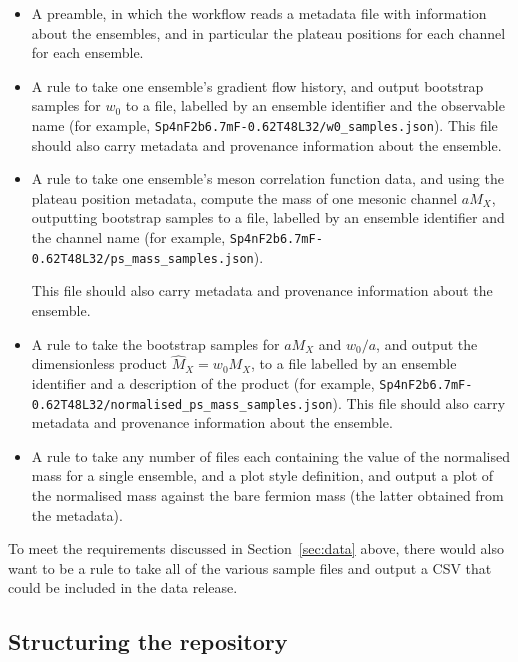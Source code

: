 \documentclass{article}
\begin{document}
\begin{itemize}
  \item
        A preamble,
        in which the workflow reads a metadata file with information about the ensembles,
        and in particular the plateau positions for each channel for each ensemble.
  \item
        A rule to take one ensemble's gradient flow history,
        and output bootstrap samples for $w_{0}$ to a file,
        labelled by an ensemble identifier and the observable name
        (for example,
        \texttt{Sp4nF2b6.7mF-0.62T48L32/\hspace{0pt}w0\_samples.json}).
        This file should also carry metadata and provenance information about the ensemble.
  \item
        A rule to take one ensemble's meson correlation function data,
        and using the plateau position metadata,
        compute the mass of one mesonic channel $aM_{X}$,
        outputting bootstrap samples to a file,
        labelled by an ensemble identifier and the channel name
        (for example,
        \texttt{Sp4nF2b6.7mF-0.62T48L32/\hspace{0pt}ps\_mass\_samples.json}).

        This file should also carry metadata and provenance information about the ensemble.
  \item
        A rule to take the bootstrap samples for $aM_{X}$ and $w_{0}/a$,
        and output the dimensionless product $\hat{M}_{X}=w_{0}M_{X}$,
        to a file labelled by an ensemble identifier and a description of the product
        (for example,
        \texttt{Sp4nF2b6.7mF-0.62T48L32/\hspace{0pt}normalised\_ps\_mass\_samples.json}).
        This file should also carry metadata and provenance information about the ensemble.
  \item
        A rule to take any number of files
        each containing the value of the normalised mass for a single ensemble,
        and a plot style definition,
        and output a plot of the normalised mass against the bare fermion mass
        (the latter obtained from the metadata).
\end{itemize}

To meet the requirements discussed in Section~\ref{sec:data} above,
there would also want to be a rule to take all of the various sample files
and output a CSV that could be included in the data release.

\subsection{Structuring the repository}
\end{document}
